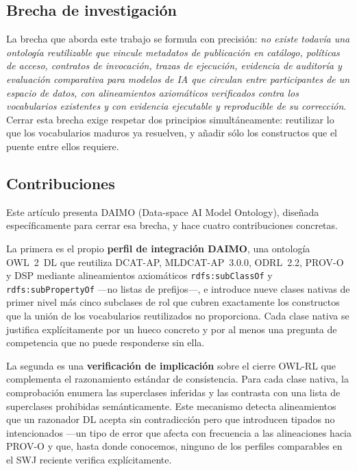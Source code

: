 \documentclass[11pt,a4paper]{article}
\newcommand{\code}[1]{\texttt{#1}}
\begin{document}
\subsection{Brecha de investigación}

La brecha que aborda este trabajo se formula con precisión: \emph{no existe todavía una ontología reutilizable que vincule metadatos de publicación en catálogo, políticas de acceso, contratos de invocación, trazas de ejecución, evidencia de auditoría y evaluación comparativa para modelos de IA que circulan entre participantes de un espacio de datos, con alineamientos axiomáticos verificados contra los vocabularios existentes y con evidencia ejecutable y reproducible de su corrección}. Cerrar esta brecha exige respetar dos principios simultáneamente: reutilizar lo que los vocabularios maduros ya resuelven, y añadir sólo los constructos que el puente entre ellos requiere.

\subsection{Contribuciones}

Este artículo presenta DAIMO (Data-space AI Model Ontology), diseñada específicamente para cerrar esa brecha, y hace cuatro contribuciones concretas.

La primera es el propio \textbf{perfil de integración DAIMO}, una ontología OWL~2~DL que reutiliza DCAT-AP, MLDCAT-AP~3.0.0, ODRL~2.2, PROV-O y DSP mediante alineamientos axiomáticos \code{rdfs:subClassOf} y \code{rdfs:subPropertyOf} ---no listas de prefijos---, e introduce nueve clases nativas de primer nivel más cinco subclases de rol que cubren exactamente los constructos que la unión de los vocabularios reutilizados no proporciona. Cada clase nativa se justifica explícitamente por un hueco concreto y por al menos una pregunta de competencia que no puede responderse sin ella.

La segunda es una \textbf{verificación de implicación} sobre el cierre OWL-RL que complementa el razonamiento estándar de consistencia. Para cada clase nativa, la comprobación enumera las superclases inferidas y las contrasta con una lista de superclases prohibidas semánticamente. Este mecanismo detecta alineamientos que un razonador DL acepta sin contradicción pero que introducen tipados no intencionados ---un tipo de error que afecta con frecuencia a las alineaciones hacia PROV-O y que, hasta donde conocemos, ninguno de los perfiles comparables en el SWJ reciente verifica explícitamente.
\end{document}
